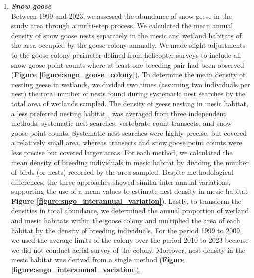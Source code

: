 \documentclass[a4paper,twoside,12pt]{article}
\begin{document}
\begin{enumerate}[label=\alph*.]
      \item[] \textit{\textbf{Snow goose}}\\
       Between 1999 and 2023, we assessed the abundance of snow geese in the study area through a multi-step process. We calculated the mean annual density of snow goose nests separately in the mesic and wetland habitats of the area occupied by the goose colony annually. We made slight adjustments to the goose colony perimeter defined from helicopter surveys to include all snow goose point counts where at least one breeding pair had been observed (\textbf{Figure \ref{figure:sngo_goose_colony}}). To determine the mean density of nesting geese in wetlands, we divided two times (assuming two individuals per nest) the total number of nests found during systematic nest searches by the total area of wetlands sampled. The density of geese nesting in mesic habitat, a less preferred nesting habitat \citep{lecomte2008}, was averaged from three independent methods: systematic nest searches, vertebrate count transects, and snow goose point counts. Systematic nest searches were highly precise, but covered a relatively small area, whereas transects and snow goose point counts were less precise but covered larger areas. For each method, we calculated the mean density of breeding individuals in mesic habitat by dividing the number of birds (or nests) recorded by the area sampled. Despite methodological differences, the three approaches showed similar inter-annual variations, supporting the use of a mean values to estimate nest density in mesic habitat \textbf{Figure \ref{figure:sngo_interannual_variation}}). Lastly, to transform the densities in total abundance, we determined the annual proportion of wetland and mesic habitats within the goose colony and multiplied the area of each habitat by the density of breeding individuals. For the period 1999 to 2009, we used the average limits of the colony over the period 2010 to 2023 because we did not conduct aerial survey of the colony. Moreover, nest density in the mesic habitat was derived from a single method (\textbf{Figure \ref{figure:sngo_interannual_variation}}). 
        			

\end{enumerate}
\end{document}
